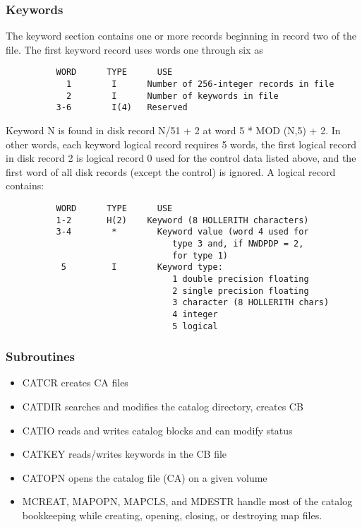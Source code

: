 \subsubsection{ Keywords}

     The keyword section contains one or more records beginning in
record two of the file.  The first keyword record uses words one
through six as

\begin{verbatim}
          WORD      TYPE      USE
            1        I      Number of 256-integer records in file
            2        I      Number of keywords in file
          3-6        I(4)   Reserved
\end{verbatim}

Keyword N is found in disk record N/51 + 2 at word 5 * MOD (N,5) + 2.
In other words, each keyword logical record requires 5 words, the
first logical record in disk record 2 is logical record 0 used for
the control data listed above, and the first word of all disk
records (except the control) is ignored.  A logical record contains:

\begin{verbatim}
          WORD      TYPE      USE
          1-2       H(2)    Keyword (8 HOLLERITH characters)
          3-4        *        Keyword value (word 4 used for
                                 type 3 and, if NWDPDP = 2,
                                 for type 1)
           5         I        Keyword type:
                                 1 double precision floating
                                 2 single precision floating
                                 3 character (8 HOLLERITH chars)
                                 4 integer
                                 5 logical

\end{verbatim}


\subsubsection{ Subroutines}
\begin{itemize}
\item CATCR   creates CA files
\item CATDIR  searches and modifies the catalog
directory, creates CB
\item CATIO   reads and writes catalog blocks and can
modify status
\item CATKEY  reads/writes keywords in the CB file
\item CATOPN  opens the catalog file (CA) on a given
volume
\item MCREAT, MAPOPN,
MAPCLS, and MDESTR handle most of the
catalog bookkeeping while creating, opening, closing, or destroying
map files.
\end{itemize}

